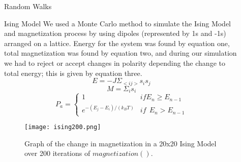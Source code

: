 \documentclass[final]{beamer}
\newlength{\sepwid}
\newlength{\onecolwid}
\begin{document}
\begin{frame}[t]
\begin{columns}[t]
\begin{column}{\onecolwid}
\begin{block}{Random Walks}
\end{block}


\begin{block}{Ising Model}
We used a Monte Carlo method to simulate the Ising Model and magnetization process by using dipoles (represented by 1s and -1s) arranged on a lattice. Energy for the system was found by equation one, total magnetization was found by equation two, and during our simulation we had to reject or accept changes in polarity depending the change to total energy; this is given by equation three.
\begin{equation}
E = -J\Sigma_{<ij>}s_{i}s_{j}
\end{equation}
\begin{equation}
M = \Sigma_{i}s_{i}
\end{equation}
\begin{equation}
P_{a} =
\begin{cases} 
      1 & if E_{n} \geq E_{n-1}\\
      e^{-(E_{j}-E_{i})/(k_{B}T)} & if \ \ E_{n} > E_{n-1}
\end{cases}
\end{equation}

\begin{figure}
\texttt{[image: ising200.png]}
\caption{Graph of the change in magnetization in a 20x20 Ising Model over 200 iterations of $magnetization().$}
\end{figure}
\end{block}
\end{column} %

\begin{column}{\sepwid}\end{column} %

\begin{column}{\onecolwid} %


\end{column}
\end{columns}
\end{frame}
\end{document}
